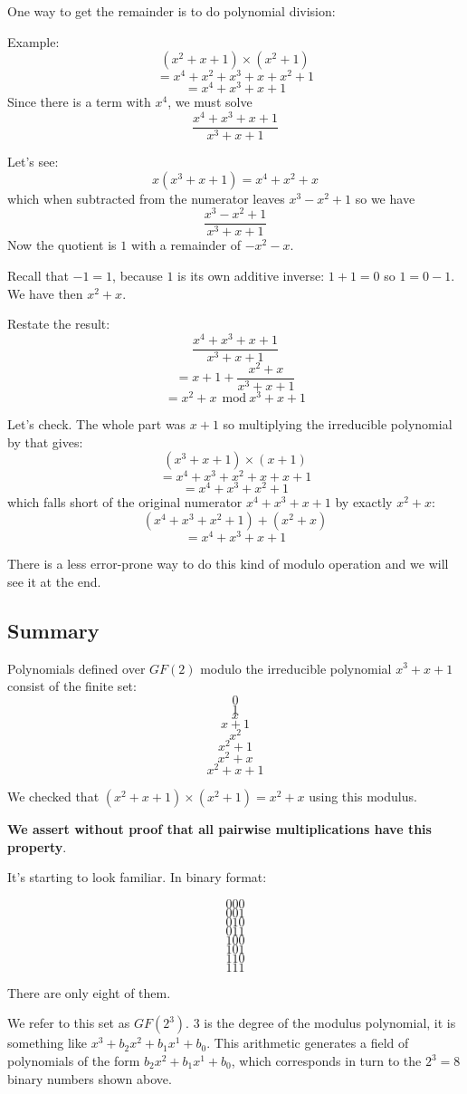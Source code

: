 \documentclass[11pt, oneside]{article}
\begin{document}
One way to get the remainder is to do polynomial division: 

Example:
\[ (x^2 + x + 1) \times (x^2 + 1) \]
\[ = x^4 + x^2 + x^3 + x + x^2 + 1  \]
\[ = x^4 + x^3 + x  + 1 \]
Since there is a term with $x^4$, we must solve
\[ \frac{x^4 + x^3 + x  + 1}{x^3 +x+1} \]

Let's see:
\[ x (x^3 + x + 1) = x^4 + x^2 + x \]
which when subtracted from the numerator leaves $x^3 - x^2 + 1$ so we have
\[ \frac{x^3 - x^2 + 1}{x^3 +x+1} \]
Now the quotient is $1$ with a remainder of $-x^2 - x$.

Recall that $-1 = 1$, because $1$ is its own additive inverse:  $1 + 1 = 0$ so $1 = 0 - 1$.  We have then $x^2 + x$.

Restate the result:
\[ \frac{x^4 + x^3 + x + 1}{x^3 + x + 1} \]
\[ = x + 1 + \frac{x^2 + x}{x^3 + x + 1} \]
\[ = x^2 + x \ \ \text{mod} \ x^3 + x + 1 \]

Let's check.  The whole part was $x + 1$ so multiplying the irreducible polynomial by that gives:
\[ (x^3 + x + 1) \times (x + 1) \]
\[ = x^4 + x^3 + x^2 + x + x + 1 \]
\[ = x^4 + x^3 + x^2 + 1 \]
which falls short of the original numerator $x^4 + x^3 + x + 1$ by exactly $x^2 + x$:
\[ (x^4 + x^3 + x^2 + 1) + (x^2 + x) \]
\[ = x^4 + x^3 + x + 1 \]

There is a less error-prone way to do this kind of modulo operation and we will see it at the end.

\subsection*{Summary}

Polynomials defined over $GF(2)$ modulo the irreducible polynomial $x^3 + x + 1$ consist of the finite set:
\[ 0 \]
\[ 1 \]
\[ x \]
\[ x + 1 \]
\[ x^2 \]
\[ x^2 + 1 \]
\[ x^2 + x \]
\[ x^2 + x + 1 \]

We checked that $(x^2 + x + 1) \times (x^2 + 1) = x^2 + x$ using this modulus.  

\textbf{We assert without proof that all pairwise multiplications have this property}.

It's starting to look familiar.  In binary format:

\[ 000 \]
\[ 001 \]
\[ 010 \]
\[ 011 \]
\[100 \]
\[101 \]
\[110 \]
\[111 \]

There are only eight of them.  

We refer to this set as $GF(2^3)$.  3 is the degree of the modulus polynomial, it is something like $x^3 + b_2x^2 + b_1x^1 + b_0$.  This arithmetic generates a field of polynomials of the form $b_2x^2 + b_1x^1 + b_0$, which corresponds in turn to the $2^3 = 8$ binary numbers shown above.
\end{document}
